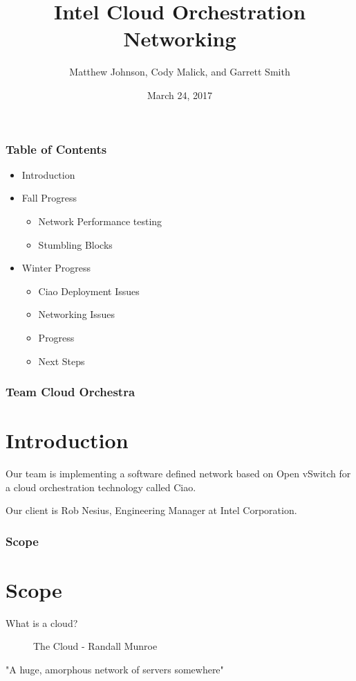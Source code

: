 \documentclass[pdf]{beamer}
\begin{document}
\title{Intel Cloud Orchestration Networking}
\author{Matthew Johnson, Cody Malick, and Garrett Smith}
\date{March 24, 2017}

\maketitle
\begin{frame}
	\frametitle{Table of Contents}
	\begin{itemize}
		\item Introduction
		\item Fall Progress
		\begin{itemize}
			\item Network Performance testing
			\item Stumbling Blocks
		\end{itemize}
		\item Winter Progress
		\begin{itemize}
			\item Ciao Deployment Issues
			\item Networking Issues
			\item Progress
			\item Next Steps
		\end{itemize}
	\end{itemize}
\end{frame}

\begin{frame}
	\frametitle{Team Cloud Orchestra}
	\section{Introduction}
	Our team is implementing a software defined network based on Open
	vSwitch for a cloud orchestration technology called Ciao.

	Our client is Rob Nesius, Engineering Manager at Intel Corporation.
\end{frame}

\begin{frame}
	\frametitle{Scope}
	\section{Scope}
	What is a cloud?
	\begin{figure}[H]
		\caption{The Cloud - Randall Munroe~\cite{xkcd908}}
		\begin{center}
		\end{center}
	\end{figure}

	"A huge, amorphous network of servers somewhere"

\end{frame}
\end{document}
